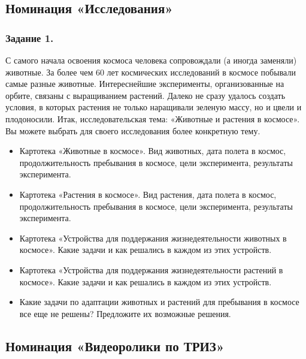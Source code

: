 \documentclass[11pt,a4paper]{article}
\begin{document}
\subsection{Номинация «Исследования»}

\subsubsection*{Задание 1.}

\newcommand{\AnimalsInCosmos}{С самого начала освоения космоса человека
  сопровождали (а иногда заменяли) животные. За более чем 60 лет космических
  исследований в космосе побывали самые разные животные. Интереснейшие
  эксперименты, организованные на орбите, связаны с выращиванием
  растений. Далеко не сразу удалось создать условия, в которых растения не
  только наращивали зеленую массу, но и цвели и плодоносили. Итак,
  исследовательская тема: «Животные и растения в космосе». Вы можете выбрать
  для своего исследования более конкретную тему.
\begin{itemize}[noitemsep]
\item Картотека «Животные в космосе». Вид животных, дата полета в космос,
  продолжительность пребывания в космосе, цели эксперимента, результаты
  эксперимента.
\item Картотека «Растения в космосе». Вид растения, дата полета в космос,
  продолжительность пребывания в космосе, цели эксперимента, результаты
  эксперимента.
\item Картотека «Устройства для поддержания жизнедеятельности животных в
  космосе». Какие задачи и как решались в каждом из этих устройств.
\item Картотека «Устройства для поддержания жизнедеятельности растений в
  космосе». Какие задачи и как решались в каждом из этих устройств.
\item Какие задачи по адаптации животных и растений для пребывания в космосе
  все еще не решены? Предложите их возможные решения.
\end{itemize}}

\AnimalsInCosmos

\subsection{Номинация «Видеоролики по ТРИЗ»}

\newcommand{\VideoOne}{Есть ли в вашем городе места, связанные с исследованием
  космоса? Сделайте репортаж о посещении музея, выставки, научного
  центра. Попробуйте взять интервью у специалистов, связанных с космическими
  исследованиями. }
\end{document}
